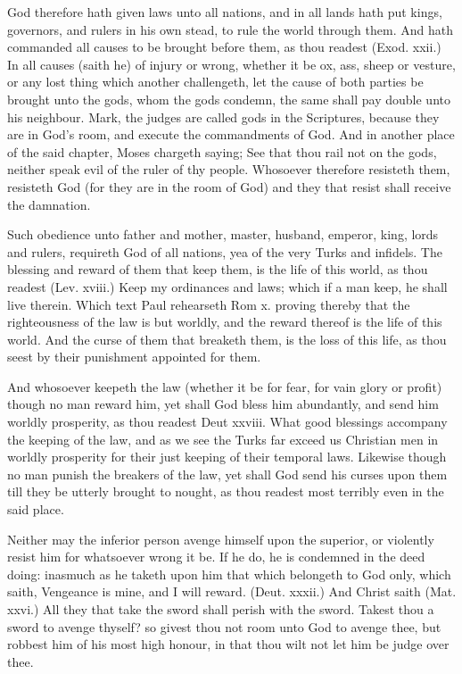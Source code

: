 God therefore hath given laws unto all nations, and in 
all lands hath put kings, governors, and rulers in his own 
stead, to rule the world through them. And hath commanded
all causes to be brought before them, as thou readest 
(Exod. xxii.) In all causes (saith he) of injury or wrong, 
whether it be ox, ass, sheep or vesture, or any lost thing 
which another challengeth, let the cause of both parties be 
brought unto the gods, whom the gods condemn, the 
same shall pay double unto his neighbour. Mark, the 
judges are called gods in the Scriptures, because they are 
in God's room, and execute the commandments of God. 
And in another place of the said chapter, Moses chargeth 
saying; See that thou rail not on the gods, neither speak 
evil of the ruler of thy people. Whosoever therefore resisteth
them, resisteth God (for they are in the room of 
God) and they that resist shall receive the damnation. 

Such obedience unto father and mother, master, 
husband, emperor, king, lords and rulers, requireth God 
of all nations, yea of the very Turks and infidels. The 
blessing and reward of them that keep them, is the life of 
this world, as thou readest (Lev. xviii.) Keep my ordinances
and laws; which if a man keep, he shall live 
therein. Which text Paul rehearseth Rom x. proving 
thereby that the righteousness of the law is but worldly, 
and the reward thereof is the life of this world. And the 
curse of them that breaketh them, is the loss of this life, 
as thou seest by their punishment appointed for them.

And whosoever keepeth the law (whether it be for fear, 
for vain glory or profit) though no man reward him, yet 
shall God bless him abundantly, and send him worldly 
prosperity, as thou readest Deut xxviii. What good 
blessings accompany the keeping of the law, and as we 
see the Turks far exceed us Christian men in worldly prosperity
for their just keeping of their temporal laws. Likewise
though no man punish the breakers of the law, yet 
shall God send his curses upon them till they be utterly 
brought to nought, as thou readest most terribly even in 
the said place.

Neither may the inferior person avenge himself upon 
the superior, or violently resist him for whatsoever wrong 
it be. If he do, he is condemned in the deed doing: 
inasmuch as he taketh upon him that which belongeth to 
God only, which saith, Vengeance is mine, and I will reward.
(Deut. xxxii.) And Christ saith (Mat. xxvi.) All 
they that take the sword shall perish with the sword. 
Takest thou a sword to avenge thyself? so givest thou not 
room unto God to avenge thee, but robbest him of his 
most high honour, in that thou wilt not let him be judge 
over thee. 

